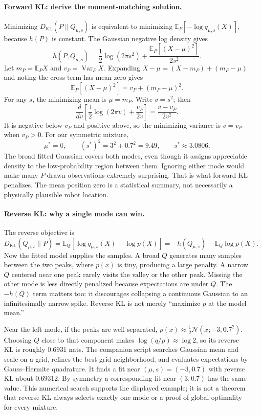 \paragraph{Forward KL: derive the moment-matching solution.}
Minimizing $D_{\mathrm{KL}}(P\|Q_{\mu,s})$ is equivalent to minimizing
$\mathbb E_P[-\log q_{\mu,s}(X)]$, because $h(P)$ is constant. The Gaussian
negative log density gives
\[
h(P,Q_{\mu,s})=\frac12\log(2\pi s^2)
+\frac{\mathbb E_P[(X-\mu)^2]}{2s^2}.
\]
Let $m_P=\mathbb E_P X$ and $v_P=\operatorname{Var}_P X$. Expanding
$X-\mu=(X-m_P)+(m_P-\mu)$ and noting the cross term has mean zero gives
\[
\mathbb E_P[(X-\mu)^2]=v_P+(m_P-\mu)^2.
\]
For any $s$, the minimizing mean is $\mu=m_P$. Write $v=s^2$; then
\[
\frac{d}{dv}\left[\frac12\log(2\pi v)+\frac{v_P}{2v}\right]
=\frac{v-v_P}{2v^2}.
\]
It is negative below $v_P$ and positive above, so the minimizing variance is
$v=v_P$ when $v_P>0$. For our symmetric mixture,
\[
\boxed{\mu^*=0,\qquad(s^*)^2=3^2+0.7^2=9.49,
\qquad s^*\approx3.0806.}
\]
The broad fitted Gaussian covers both modes, even though it assigns appreciable
density to the low-probability region between them. Ignoring either mode would
make many $P$-drawn observations extremely surprising. That is what forward KL
penalizes. The mean position zero is a statistical summary, not necessarily a
physically plausible robot location.

\paragraph{Reverse KL: why a single mode can win.}
The reverse objective is
\[
D_{\mathrm{KL}}(Q_{\mu,s}\|P)
=\mathbb E_Q[\log q_{\mu,s}(X)-\log p(X)]
=-h(Q_{\mu,s})-\mathbb E_Q\log p(X).
\]
Now the fitted model supplies the samples. A broad $Q$ generates many samples
between the two peaks, where $p(x)$ is tiny, producing a large penalty. A narrow
$Q$ centered near one peak rarely visits the valley or the other peak. Missing
the other mode is less directly penalized because expectations are under $Q$.
The $-h(Q)$ term matters too: it discourages collapsing a continuous Gaussian
to an infinitesimally narrow spike. Reverse KL is not merely ``maximize $p$ at
the model mean.''

Near the left mode, if the peaks are well separated,
$p(x)\approx\tfrac12\mathcal N(x;-3,0.7^2)$. Choosing $Q$ close to that component
makes $\log(q/p)\approx\log2$, so its reverse KL is roughly $0.6931$ nats.
The companion script searches Gaussian mean and scale on a grid, refines the
best grid neighborhood, and evaluates expectations by Gauss--Hermite quadrature.
It finds a fit near $(\mu,s)=(-3,0.7)$ with reverse KL about $0.69312$.
By symmetry a corresponding fit near $(3,0.7)$ has the same value. This numerical
search supports the displayed example; it is not a theorem that reverse KL
always selects exactly one mode or a proof of global optimality for every
mixture.


